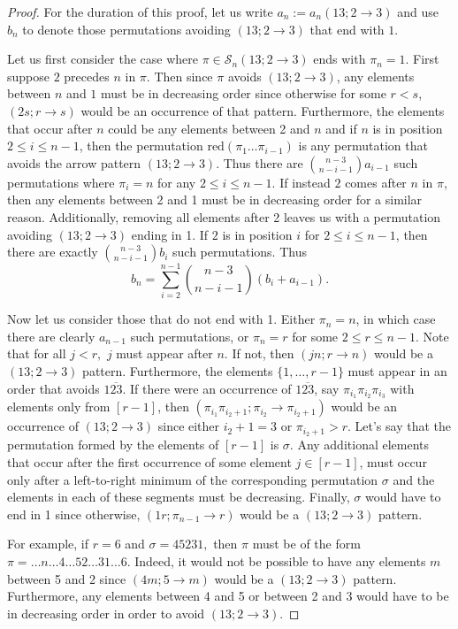 \documentclass[11pt]{article}
\renewcommand\S{\mathcal S}
\theoremstyle{definition}
\begin{document}
\begin{proof}
For the duration of this proof, let us write $a_n:=a_n(13;2\to3)$ and use $b_n$ to denote those permutations avoiding $(13;2\to3)$ that end with $1.$ 

Let us first consider the case where $\pi\in\S_n(13;2\to3)$ ends with $\pi_n=1$. First suppose $2$ precedes $n$ in $\pi.$ Then since $\pi$ avoids $(13;2\to3)$, any elements between $n$ and $1$ must be in decreasing order since otherwise for some $r<s$, $(2s;r\to s)$  would be an occurrence of that pattern. Furthermore, the elements that occur after $n$ could be any elements between 2 and $n$ and if $n$ is in position $2\leq i \leq n-1$, then the permutation $\text{red}(\pi_1\ldots \pi_{i-1})$ is any permutation that avoids the arrow pattern $(13;2\to3)$. Thus there are $\binom{n-3}{n-i-1}a_{i-1}$ such permutations where $\pi_i=n$ for any $2\leq i\leq n-1$. If instead $2$ comes after $n$ in $\pi$, then any elements between 2 and 1 must be in decreasing order for a similar reason. Additionally, removing all elements after 2 leaves us with a permutation avoiding $(13;2\to3)$ ending in 1. If $2$ is in position $i$ for $2\leq i \leq n-1$, then there are exactly $\binom{n-3}{n-i-1}b_{i}$ such permutations. Thus
\[b_n=\sum_{i=2}^{n-1}\binom{n-3}{n-i-1}(b_{i}+a_{i-1}).\]

Now let us consider those that do not end with 1. Either $\pi_n=n$, in which case there are clearly $a_{n-1}$ such permutations, or $\pi_n=r$ for some $2\leq r\leq n-1.$
 Note that for all $j<r,$ $j$ must appear after $n$. If not, then $(jn;r\to n)$ would be a $(13;2\to3)$ pattern. Furthermore, the elements $\{1,\ldots, r-1\}$ must appear in an order that avoids $1\overline{23}.$ If there were an occurrence of $1\overline{23}$, say $\pi_{i_1}\pi_{i_2}\pi_{i_3}$ with elements only from $[r-1]$, then $(\pi_{i_1}\pi_{i_2+1};\pi_{i_2}\to\pi_{i_2+1})$ would be an occurrence of $(13;2\to3)$ since either $i_2+1=3$ or $\pi_{i_2+1}>r.$ Let's say that the permutation formed by the elements of $[r-1]$ is $\sigma$. Any additional elements that occur after the first occurrence of some element $j\in[r-1]$, must occur only after a left-to-right minimum of the corresponding permutation $\sigma$ and the elements in each of these segments must be decreasing. Finally, $\sigma$ would have to end in 1 since otherwise, $(1r;\pi_{n-1}\to r)$ would be a $(13;2\to3)$ pattern.
 
 For example, if $r=6$ and $\sigma=45231,$ then $\pi$ must be of the form $
 \pi = \ldots n \ldots 4\ldots 52\ldots  31\ldots 6.$
 Indeed, it would not be possible to have any elements $m$ between 5 and 2 since $(4m;5\to m)$ would be a $(13;2\to3)$ pattern. Furthermore, any elements between 4 and 5 or between 2 and 3 would have to be in decreasing order in order to avoid $(13;2\to3).$


\end{proof}
\end{document}
